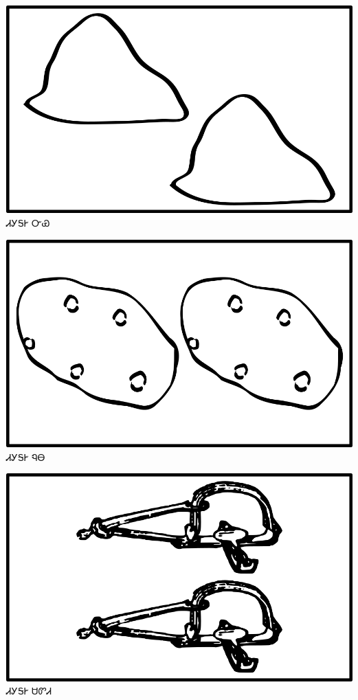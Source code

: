 \documentclass[avery5371]{flashcards}%
\begin{document}
\begin{flashcard}{
\includegraphics[width=0.95\columnwidth,height=.51\columnwidth,keepaspectratio]{../artwork/objects-neutral/tali-nvya}
}\Huge ᏗᎩᎦᎨ ᏅᏯ
\end{flashcard}

\begin{flashcard}{
\includegraphics[width=0.95\columnwidth,height=.51\columnwidth,keepaspectratio]{../artwork/objects-neutral/tali-nuna}
}\Huge ᏗᎩᎦᎨ ᏄᎾ
\end{flashcard}

\begin{flashcard}{
\includegraphics[width=0.95\columnwidth,height=.51\columnwidth,keepaspectratio]{../artwork/objects-neutral/tali-sadvdi}
}\Huge ᏗᎩᎦᎨ ᏌᏛᏗ
\end{flashcard}
\end{document}
